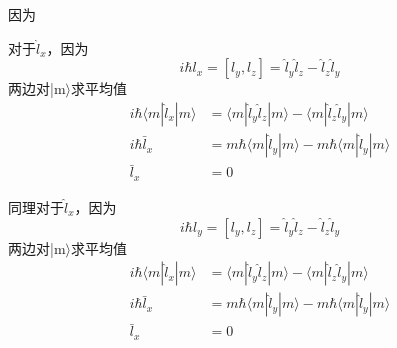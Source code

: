 因为

对于$\hat{l}_x$，因为
$$
i\hbar l_x=\left[ l_y,l_z \right] =\hat{l}_y\hat{l}_z-\hat{l}_z\hat{l}_y
$$
两边对|m$\rangle$求平均值
\begin{align}
i\hbar \left. \langle m|\hat{l}_x|m \right. \rangle &=\langle m|\hat{l}_y\hat{l}_z|m\rangle -\left. \langle m\left| \hat{l}_z\hat{l}_y \right|m \right. \rangle\\
	i\hbar \bar{l}_x&=m\hbar \langle m|\hat{l}_y|m\rangle -m\hbar \left. \langle m|\hat{l}_y|m \right. \rangle \\
	\bar{l}_x&=0
\end{align}

同理对于$\hat{l}_x$，因为
$$
i\hbar l_y=\left[ l_y,l_z \right] =\hat{l}_y\hat{l}_z-\hat{l}_z\hat{l}_y
$$
两边对|m$\rangle$求平均值
\begin{align}
i\hbar \left. \langle m|\hat{l}_x|m \right. \rangle &=\langle m|\hat{l}_y\hat{l}_z|m\rangle -\left. \langle m\left| \hat{l}_z\hat{l}_y \right|m \right. \rangle\\
	i\hbar \bar{l}_x&=m\hbar \langle m|\hat{l}_y|m\rangle -m\hbar \left. \langle m|\hat{l}_y|m \right. \rangle \\
	\bar{l}_x&=0
\end{align}